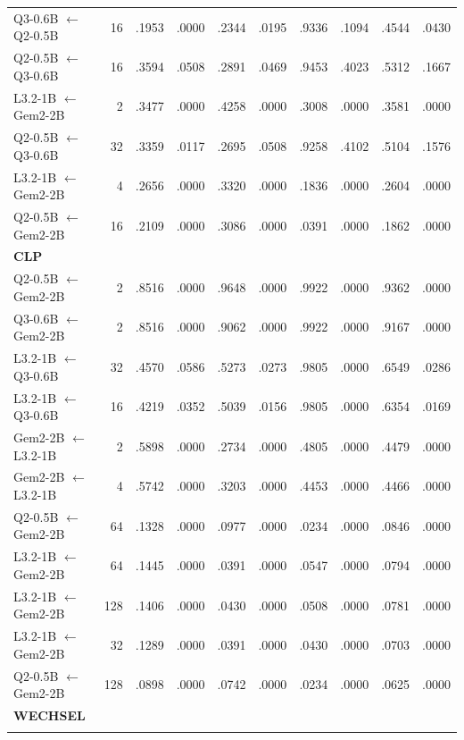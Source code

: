 \documentclass{article}
\theoremstyle{plain}
\theoremstyle{definition}
\theoremstyle{remark}
\begin{document}
\begin{longtable}{p{}rrrrrrrrr}
Q3-0.6B $\leftarrow$ Q2-0.5B & 16 & .1953 & .0000 & .2344 & .0195 & .9336 & .1094 & .4544 & .0430 \\
Q2-0.5B $\leftarrow$ Q3-0.6B & 16 & .3594 & .0508 & .2891 & .0469 & .9453 & .4023 & .5312 & .1667 \\
L3.2-1B $\leftarrow$ Gem2-2B & 2 & .3477 & .0000 & .4258 & .0000 & .3008 & .0000 & .3581 & .0000 \\
Q2-0.5B $\leftarrow$ Q3-0.6B & 32 & .3359 & .0117 & .2695 & .0508 & .9258 & .4102 & .5104 & .1576 \\
L3.2-1B $\leftarrow$ Gem2-2B & 4 & .2656 & .0000 & .3320 & .0000 & .1836 & .0000 & .2604 & .0000 \\
Q2-0.5B $\leftarrow$ Gem2-2B & 16 & .2109 & .0000 & .3086 & .0000 & .0391 & .0000 & .1862 & .0000 \\
\midrule
\multicolumn{10}{l}{\textbf{CLP}} \\
\addlinespace[2pt]
Q2-0.5B $\leftarrow$ Gem2-2B & 2 & .8516 & .0000 & .9648 & .0000 & .9922 & .0000 & .9362 & .0000 \\
Q3-0.6B $\leftarrow$ Gem2-2B & 2 & .8516 & .0000 & .9062 & .0000 & .9922 & .0000 & .9167 & .0000 \\
L3.2-1B $\leftarrow$ Q3-0.6B & 32 & .4570 & .0586 & .5273 & .0273 & .9805 & .0000 & .6549 & .0286 \\
L3.2-1B $\leftarrow$ Q3-0.6B & 16 & .4219 & .0352 & .5039 & .0156 & .9805 & .0000 & .6354 & .0169 \\
Gem2-2B $\leftarrow$ L3.2-1B & 2 & .5898 & .0000 & .2734 & .0000 & .4805 & .0000 & .4479 & .0000 \\
Gem2-2B $\leftarrow$ L3.2-1B & 4 & .5742 & .0000 & .3203 & .0000 & .4453 & .0000 & .4466 & .0000 \\
Q2-0.5B $\leftarrow$ Gem2-2B & 64 & .1328 & .0000 & .0977 & .0000 & .0234 & .0000 & .0846 & .0000 \\
L3.2-1B $\leftarrow$ Gem2-2B & 64 & .1445 & .0000 & .0391 & .0000 & .0547 & .0000 & .0794 & .0000 \\
L3.2-1B $\leftarrow$ Gem2-2B & 128 & .1406 & .0000 & .0430 & .0000 & .0508 & .0000 & .0781 & .0000 \\
L3.2-1B $\leftarrow$ Gem2-2B & 32 & .1289 & .0000 & .0391 & .0000 & .0430 & .0000 & .0703 & .0000 \\
Q2-0.5B $\leftarrow$ Gem2-2B & 128 & .0898 & .0000 & .0742 & .0000 & .0234 & .0000 & .0625 & .0000 \\
\midrule
\multicolumn{10}{l}{\textbf{WECHSEL}} \\
\addlinespace[2pt]

\end{longtable}
\end{document}
